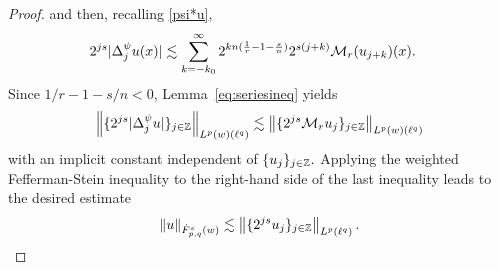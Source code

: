 \begin{proof}
and then, recalling \eqref{psi*u}, 
\begin{align*}
2^{js} |\Delta^\psi_j  u(x)| & \lesssim  \sum_{k =  - k_0}^\infty 2^{k n (\frac{1}{r} -1-\frac{s}{n})} 2^{s(j+k)}\M_r(u_{j+k})(x).
\end{align*}
Since $1/r -1-s/n < 0$,   Lemma~\ref{eq:seriesineq}  yields
$$
\norm{\{ 2^{js} |\Delta^\psi_j  u|\}_{j\in\ent}}{L^p(w)(\ell^{q})} \lesssim \norm{\{2^{js} \M_ru_j\}_{j\in\ent}}{L^p(w)(\ell^{q})}
$$
with an implicit constant independent of $\{u_j\}_{j\in \ent}.$
Applying the weighted  Fefferman-Stein inequality  to the right-hand side of the last inequality leads to the desired estimate
\begin{equation*}
\norm{u}{\tlw{p}{s}{q}{w}} \lesssim \norm{\{2^{js}u_j\}_{j\in\ent}}{L^p(\ell^{q})}.
\end{equation*}


\end{proof}
